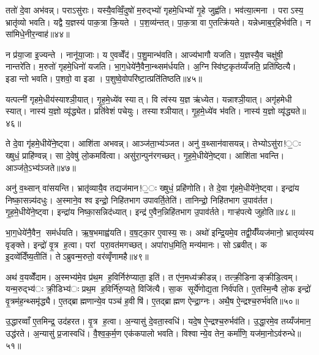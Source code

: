ततो॑ दे॒वा अभ॑वन्न्। पराऽसु॑राः। यस्यै॒वव्विँ॒दुषो॑ म॒रुद्भ्यो॑ गृहमे॒धिभ्यो॑ गृ॒हे जुह्व॑ति। भव॑त्या॒त्मना। पराऽस्य॒ भ्रातृ॑व्यो भवति। यद्वै य॒ज्ञस्य॑ पाक॒त्रा क्रि॒यते। प॒श॒व्य॑न्तत्। पा॒क॒त्रा वा ए॒तत्क्रि॑यते। यन्नेध्माब॒र्॒हिर्भव॑ति। न सा॑मिधे॒नीर॒न्वाह॑॥४४॥

न प्र॑या॒जा इ॒ज्यन्ते। नानू॑या॒जाः। य ए॒वव्वेँद॑। प॒शु॒मान्भ॑वति। आज्य॑भागौ यजति। य॒ज्ञस्यै॒व चक्षु॑षी॒ नान्तरे॑ति। म॒रुतो॑ गृहमे॒धिनो॑ यजति। भा॒ग॒धेये॑नै॒वैना॒न्थ्सम॑र्धयति। अ॒ग्निस्वि॑ष्ट॒कृत॑य्यँजति॒ प्रति॑ष्ठित्यै। इडान्तो भवति। प॒शवो॒ वा इडा। प॒शुष्वे॒वोपरि॑ष्टा॒त्प्रति॑तिष्ठति॥४५॥


यत्पत्नी॑ गृहमे॒धीय॑स्याश्ञी॒यात्। गृ॒ह॒मे॒ध्ये॑व स्यात्। वि त्व॑स्य य॒ज्ञ ऋ॑ध्येत। यन्नाश्ञी॒यात्। अगृ॑हमेधी स्यात्। नास्य॑ य॒ज्ञो व्यृ॑द्ध्येत। प्रति॑वेशं पचेयुः। तस्याश्ञीयात्। गृ॒ह॒मे॒ध्ये॑व भ॑वति। नास्य॑ य॒ज्ञो व्यृ॑द्ध्यते॥४६॥

ते दे॒वा गृ॑हमे॒धीये॑ने॒ष्ट्वा। आशि॑ता अभवन्न्। आञ्ज॑ता॒भ्य॑ञ्जत। अनु॑ व॒थ्सान॑वासयन्न्। तेभ्योऽसु॑रा!॒ः ख्षुधं॒ प्राहि॑ण्वन्न्। सा दे॒वेषु॑ लो॒कमवि॑त्वा। असु॑रा॒न्पुन॑रगच्छत्। गृ॒ह॒मे॒धीये॑ने॒ष्ट्वा। आशि॑ता भवन्ति। आञ्ज॑ते॒ऽभ्य॑ञ्जते॥४७॥

अनु॑ व॒थ्सान् वा॑सयन्ति। भ्रातृ॑व्यायै॒व तद्यज॑मान!॒ः ख्षुधं॒ प्रहि॑णोति। ते दे॒वा गृ॑हमे॒धीये॑ने॒ष्ट्वा। इन्द्रा॑य निष्का॒सन्न्य॑दधुः। अ॒स्माने॒व श्व इन्द्रो॒ निहि॑तभाग उपावर्ति॒तेति॑। तानिन्द्रो॒ निहि॑तभाग उ॒पाव॑र्तत। गृ॒ह॒मे॒धीये॑ने॒ष्ट्वा। इन्द्रा॑य निष्का॒सन्निद॑ध्यात्। इन्द्र॑ ए॒वैन॒न्निहि॑तभाग उ॒पाव॑र्तते। गाऱ्ह॑पत्ये जुहोति॥४८॥

भा॒ग॒धेये॑नै॒वैन॒ सम॑र्धयति। ऋ॒ष॒भमाह्व॑यति। व॒ष॒ट्का॒र ए॒वास्य॒ सः। अथो॑ इन्द्रि॒यमे॒व तद्वी॒र्यँ॑य्यज॑मानो॒ भ्रातृव्य॑स्य वृङ्क्ते। इन्द्रो॑ वृ॒त्र ह॒त्वा। परां परा॒वत॑मगच्छत्। अपा॑राध॒मिति॒ मन्य॑मानः। सोऽब्रवीत्। क इ॒दव्वे॑दिँष्य॒तीति॑। तेऽब्रुवन्म॒रुतो॒ वर॑व्वृँणामहै॥४९॥

अथ॑ व॒यव्वेँ॑दाम। अ॒स्मभ्य॑मे॒व प्र॑थ॒म ह॒विर्निरु॑प्याता॒ इति॑। त ए॑न॒मध्य॑क्रीडन्न्। तत्क्री॒डिनाङ्क्रीडि॒त्वम्। यन्म॒रुद्भ्य॑ः क्री॒डिभ्य॑ः प्रथ॒म ह॒विर्नि॑रु॒प्यते॒ विजि॑त्यै। सा॒क सूर्ये॑णोद्य॒ता निर्व॑पति। ए॒तस्मि॒न्वै लो॒क इन्द्रो॑ वृ॒त्रम॑ह॒न्थ्समृ॑द्ध्यै। ए॒तद्ब्राह्मणान्ये॒व पञ्च॑ ह॒वीषि॑। ए॒तद्ब्राह्मण ऐन्द्रा॒ग्नः। अथै॒ष ऐ॒न्द्रश्च॒रुर्भ॑वति॥५०॥

उ॒द्धारव्वाँ ए॒तमिन्द्र॒ उद॑हरत। वृ॒त्र ह॒त्वा। अ॒न्यासु॑ दे॒वता॒स्वधि॑। यदे॒ष ऐ॒न्द्रश्च॒रुर्भव॑ति। उ॒द्धा॒रमे॒व तय्यँज॑मान॒ उद्ध॑रते। अ॒न्यासु॑ प्र॒जास्वधि॑। वै॒श्व॒क॒र्म॒ण एक॑कपालो भवति। विश्वान्ये॒व तेन॒ कर्मा॑णि॒ यज॑मा॒नोऽव॑रुन्धे॥५१॥

